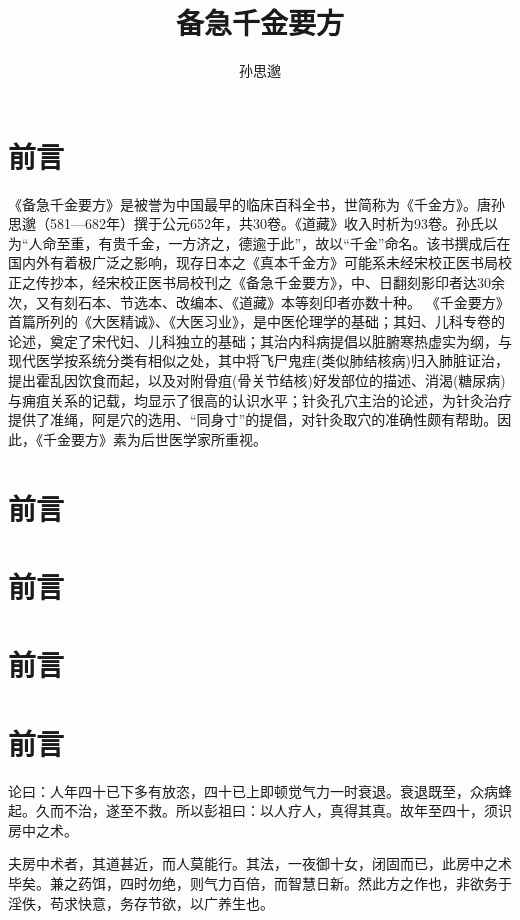 \documentclass{ctexbook}
\title{备急千金要方}
\author{孙思邈}
\date{}
\begin{document}
	
	\maketitle
	\tableofcontents
	
	\chapter{前言}
	《备急千金要方》是被誉为中国最早的临床百科全书，世简称为《千金方》。唐孙思邈（581—682年）撰于公元652年，共30卷。《道藏》收入时析为93卷。孙氏以为“人命至重，有贵千金，一方济之，德逾于此”，故以“千金”命名。该书撰成后在国内外有着极广泛之影响，现存日本之《真本千金方》可能系未经宋校正医书局校正之传抄本，经宋校正医书局校刊之《备急千金要方》，中、日翻刻影印者达30余次，又有刻石本、节选本、改编本、《道藏》本等刻印者亦数十种。
	《千金要方》首篇所列的《大医精诚》、《大医习业》，是中医伦理学的基础；其妇、儿科专卷的论述，奠定了宋代妇、儿科独立的基础；其治内科病提倡以脏腑寒热虚实为纲，与现代医学按系统分类有相似之处，其中将飞尸鬼疰(类似肺结核病)归入肺脏证治，提出霍乱因饮食而起，以及对附骨疽(骨关节结核)好发部位的描述、消渴(糖尿病)与痈疽关系的记载，均显示了很高的认识水平；针灸孔穴主治的论述，为针灸治疗提供了准绳，阿是穴的选用、“同身寸”的提倡，对针灸取穴的准确性颇有帮助。因此，《千金要方》素为后世医学家所重视。
	
	\chapter{前言}
	\chapter{前言}
	\chapter{前言}
	\chapter{前言}
	论曰：人年四十已下多有放恣，四十已上即顿觉气力一时衰退。衰退既至，众病蜂起。久而不治，遂至不救。所以彭祖曰：以人疗人，真得其真。故年至四十，须识房中之术。
	
	夫房中术者，其道甚近，而人莫能行。其法，一夜御十女，闭固而已，此房中之术毕矣。兼之药饵，四时勿绝，则气力百倍，而智慧日新。然此方之作也，非欲务于淫佚，苟求快意，务存节欲，以广养生也。
\end{document}

